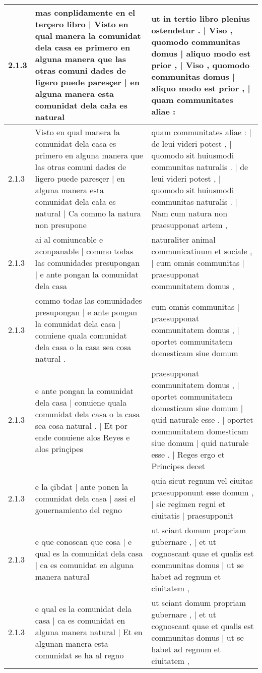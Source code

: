 \begin{tabular}{|p{1cm}|p{6.5cm}|p{6.5cm}|}
2.1.3 & mas conplidamente en el terçero libro | Visto en qual manera la comunidat dela casa es primero en alguna manera que las otras comuni dades de ligero puede paresçer | en alguna manera esta comunidat dela cała es natural & ut in tertio libro plenius ostendetur . | Viso , quomodo communitas domus | aliquo modo est prior , | Viso , quomodo communitas domus | aliquo modo est prior , | quam communitates aliae : \\\hline
2.1.3 & Visto en qual manera la comunidat dela casa es primero en alguna manera que las otras comuni dades de ligero puede paresçer | en alguna manera esta comunidat dela cała es natural | Ca commo la natura non presupone & quam communitates aliae : | de leui videri potest , | quomodo sit huiusmodi communitas naturalis . | de leui videri potest , | quomodo sit huiusmodi communitas naturalis . | Nam cum natura non praesupponat artem , \\\hline
2.1.3 & ai al comiuncable e aconpanable | commo todas las comunidades presupongan | e ante pongan la comunidat dela casa & naturaliter animal communicatiuum et sociale , | cum omnis communitas | praesupponat communitatem domus , \\\hline
2.1.3 & commo todas las comunidades presupongan | e ante pongan la comunidat dela casa | conuiene quala comunidat dela casa o la casa sea cosa natural . & cum omnis communitas | praesupponat communitatem domus , | oportet communitatem domesticam siue domum \\\hline
2.1.3 & e ante pongan la comunidat dela casa | conuiene quala comunidat dela casa o la casa sea cosa natural . | Et por ende conuiene alos Reyes e alos prinçipes & praesupponat communitatem domus , | oportet communitatem domesticam siue domum | quid naturale esse . | oportet communitatem domesticam siue domum | quid naturale esse . | Reges ergo et Principes decet \\\hline
2.1.3 & e la çibdat | ante ponen la comunidat dela casa | assi el gouernamiento del regno & quia sicut regnum vel ciuitas praesupponunt esse domum , | sic regimen regni et ciuitatis | praesupponit \\\hline
2.1.3 & e que conoscan que cosa | e qual es la comunidat dela casa | ca es comunidat en alguna manera natural & ut sciant domum propriam gubernare , | et ut cognoscant quae et qualis est communitas domus | ut se habet ad regnum et ciuitatem , \\\hline
2.1.3 & e qual es la comunidat dela casa | ca es comunidat en alguna manera natural | Et en algunan manera esta comunidat se ha al regno & ut sciant domum propriam gubernare , | et ut cognoscant quae et qualis est communitas domus | ut se habet ad regnum et ciuitatem , \\\hline

\end{tabular}
